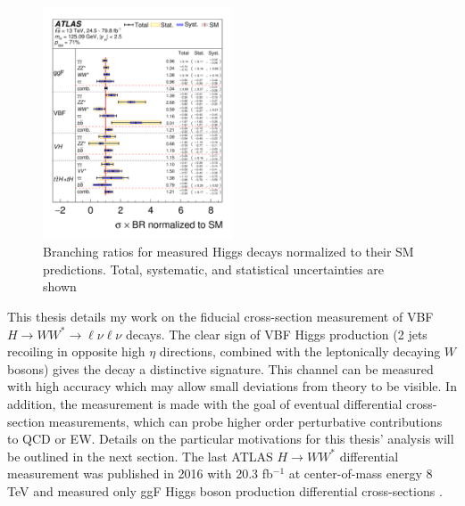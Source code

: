 \begin{figure}[H]
        \centering
    \includegraphics[width=0.5\textwidth] {Pictures/branchingratio.png}\hspace{1cm}
    \caption{Branching ratios for measured Higgs decays normalized to their SM predictions. Total, systematic, and statistical uncertainties are shown \cite{HiggsCurrent}}
    \label{fig:branchingratio}
\end{figure}
This thesis details my work on the fiducial cross-section measurement of VBF $H\rightarrow WW^*\rightarrow\ell\nu\ell\nu$ decays. The clear sign of VBF Higgs production (2 jets recoiling in opposite high $\eta$ directions, combined with the leptonically decaying $W$ bosons) gives the decay a distinctive signature. This channel can be measured with high accuracy which may allow small deviations from theory to be visible. In addition, the measurement is made with the goal of eventual differential cross-section measurements, which can probe higher order perturbative contributions to QCD or EW. Details on the particular motivations for this thesis' analysis will be outlined in the next section. The last ATLAS $H\rightarrow WW^*$ differential measurement was published in 2016 with 20.3 fb$^{-1}$ at center-of-mass energy 8 TeV and measured only ggF Higgs boson production differential cross-sections \cite{HiggsDifferential}. 


